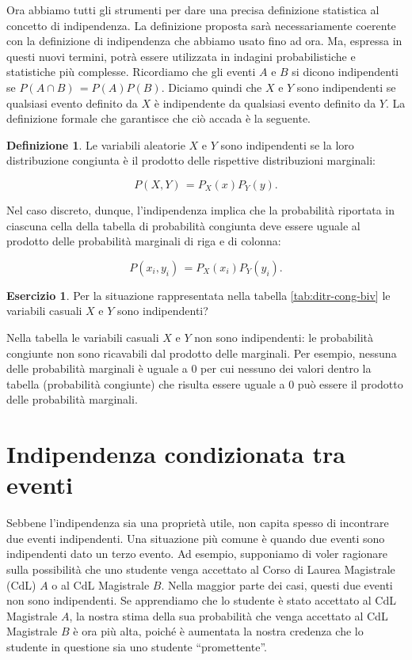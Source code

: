 \documentclass[
  11pt,
]{krantz}
\theoremstyle{definition}
\newtheorem{definition}{Definizione}[chapter]
\theoremstyle{definition}
\theoremstyle{definition}
\newtheorem{exercise}{Esercizio}[chapter]
\theoremstyle{definition}
\theoremstyle{remark}
\begin{document}
Ora abbiamo tutti gli strumenti per dare una precisa definizione statistica al concetto di indipendenza. La definizione proposta sarà necessariamente coerente con la definizione di indipendenza che abbiamo usato fino ad ora. Ma, espressa in questi nuovi termini, potrà essere utilizzata in indagini probabilistiche e statistiche più complesse. Ricordiamo che gli eventi \(A\) e \(B\) si dicono indipendenti se \(P (A \cap B)\, = P(A) P(B)\). Diciamo quindi che \(X\) e \(Y\) sono indipendenti se qualsiasi evento definito da \(X\) è indipendente da qualsiasi evento definito da \(Y\). La definizione formale che garantisce che ciò accada è la seguente.

\begin{definition}
Le variabili aleatorie \(X\) e \(Y\) sono indipendenti se la loro distribuzione congiunta è il prodotto delle rispettive distribuzioni marginali:

\begin{equation}
P(X, Y)\, = P_X(x)P_Y(y).
\end{equation}
\end{definition}

Nel caso discreto, dunque, l'indipendenza implica che la probabilità riportata in ciascuna cella della tabella di probabilità congiunta deve essere uguale al prodotto delle probabilità marginali di riga e di colonna:

\[
P(x_i, y_i)\, = P_X(x_i) P_Y(y_i).
\]

\begin{exercise}
Per la situazione rappresentata nella tabella \ref{tab:ditr-cong-biv} le variabili casuali \(X\) e \(Y\) sono indipendenti?

Nella tabella le variabili casuali \(X\) e \(Y\) non sono indipendenti: le probabilità congiunte non sono ricavabili dal prodotto delle marginali. Per esempio, nessuna delle probabilità marginali è uguale a \(0\) per cui nessuno dei valori dentro la tabella (probabilità congiunte) che risulta essere uguale a \(0\) può essere il prodotto delle probabilità marginali.
\end{exercise}

\hypertarget{indipendenza-condizionata-tra-eventi}{%
\section{Indipendenza condizionata tra eventi}\label{indipendenza-condizionata-tra-eventi}}

Sebbene l'indipendenza sia una proprietà utile, non capita spesso di incontrare due eventi indipendenti. Una situazione più comune è quando due eventi sono indipendenti dato un terzo evento. Ad esempio, supponiamo di voler ragionare sulla possibilità che uno studente venga accettato al Corso di Laurea Magistrale (CdL) \(A\) o al CdL Magistrale \(B\). Nella maggior parte dei casi, questi due eventi non sono indipendenti. Se apprendiamo che lo studente è stato accettato al CdL Magistrale \(A\), la nostra stima della sua probabilità che venga accettato al CdL Magistrale \(B\) è ora più alta, poiché è aumentata la nostra credenza che lo studente in questione sia uno studente ``promettente''.
\end{document}
